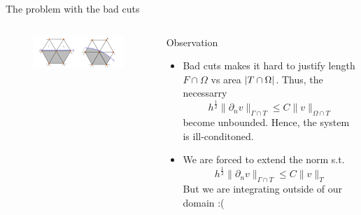 \begin{frame}{The problem with the bad cuts}
        \begin{columns}
        \begin{column}{0.5\textwidth}
    \begin{figure}
        \centering
        \includegraphics[width=8.8cm]{figures/bad_cuts.png}
    \end{figure}
        \end{column}

        \begin{column}{0.5\textwidth}
    \begin{block}{Observation}
        \begin{itemize}
            \item Bad cuts makes it hard to justify length $F\cap \Omega$  vs area $\left\lvert T\cap \Omega  \right\rvert $. Thus, the necessarry \[
h^{\frac{1}{2}} \| \partial _{n} v \|_{ \Gamma \cap T  }^{  } \le C \| v  \|_{ \Omega \cap T      }^{  }
            \]
            become unbounded. Hence, the system is ill-conditoned.
            \item  We are forced to extend the norm s.t. \[
h^{\frac{1}{2}} \| \partial _{n} v \|_{ \Gamma \cap T  }^{  } \le C \| v  \|_{  T      }^{  }
            \]
            But we are integrating outside of our domain :(

        \end{itemize}
    \end{block}
        \end{column}
        \end{columns}
\end{frame}

